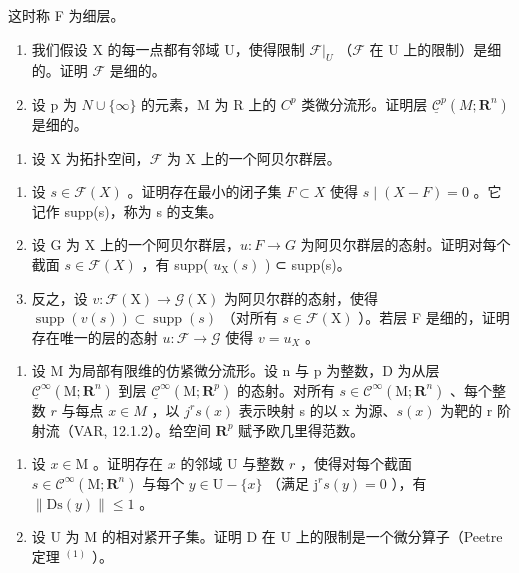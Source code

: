 这时称 F 为细层。

\begin{enumerate}
\def\labelenumi{\alph{enumi})}
\setcounter{enumi}{1}
\item
  我们假设 X 的每一点都有邻域 U，使得限制 \(\mathcal{F}|_{U}\) （\(\mathcal{F}\) 在 U 上的限制）是细的。证明 \(\mathcal{F}\) 是细的。
\item
  设 p 为 \(N \cup \{\infty\}\) 的元素，M 为 R 上的 \(C^{p}\) 类微分流形。证明层 \(\underline{\mathcal{C}}^{p}(M; \mathbf{R}^{n})\) 是细的。
\end{enumerate}

\begin{enumerate}
\def\labelenumi{\arabic{enumi})}
\setcounter{enumi}{1}
\tightlist
\item
  设 X 为拓扑空间，\(\mathcal{F}\) 为 X 上的一个阿贝尔群层。
\end{enumerate}

\begin{enumerate}
\def\labelenumi{\alph{enumi})}
\item
  设 \(s \in \mathcal{F}(X)\) 。证明存在最小的闭子集 \(F \subset X\) 使得 \(s \mid (X - F) = 0\) 。它记作 supp(s)，称为 s 的支集。
\item
  设 G 为 X 上的一个阿贝尔群层，\(u: F \to G\) 为阿贝尔群层的态射。证明对每个截面 \(s \in \mathcal{F}(X)\) ，有 supp( \(u_{\mathrm{X}}(s)\) ) ⊂ supp(s)。
\item
  反之，设 \(v\colon\mathcal{F}(\mathrm{X})\to\mathcal{G}(\mathrm{X})\) 为阿贝尔群的态射，使得 \(\operatorname{supp}(v(s))\subset\operatorname{supp}(s)\) （对所有 \(s\in\mathcal{F}(\mathrm{X})\) ）。若层 F 是细的，证明存在唯一的层的态射 \(u\colon\mathcal{F}\to\mathcal{G}\) 使得 \(v=u_{X}\) 。
\end{enumerate}

\begin{enumerate}
\def\labelenumi{\arabic{enumi})}
\setcounter{enumi}{2}
\tightlist
\item
  设 M 为局部有限维的仿紧微分流形。设 n 与 p 为整数，D 为从层 \(\underline{\mathcal{C}}^{\infty}(\mathrm{M};\mathbf{R}^{n})\) 到层 \(\underline{\mathcal{C}}^{\infty}(\mathrm{M};\mathbf{R}^{p})\) 的态射。对所有 \(s \in \mathcal{C}^{\infty}(\mathrm{M};\mathbf{R}^{n})\) 、每个整数 \(r\) 与每点 \(x \in M\) ，以 \(j^{r}s(x)\) 表示映射 s 的以 x 为源、\(s(x)\) 为靶的 r 阶射流（VAR, 12.1.2）。给空间 \(\mathbf{R}^{p}\) 赋予欧几里得范数。
\end{enumerate}

\begin{enumerate}
\def\labelenumi{\alph{enumi})}
\item
  设 \(x \in \mathrm{M}\) 。证明存在 \(x\) 的邻域 U 与整数 \(r\) ，使得对每个截面 \(s \in \mathcal{C}^{\infty}(\mathrm{M}; \mathbf{R}^{n})\) 与每个 \(y \in \mathrm{U} - \{x\}\) （满足 \(\mathrm{j}^{r}s(y) = 0\) ），有 \(\| \mathrm{Ds}(y) \| \leqslant 1\) 。
\item
  设 U 为 M 的相对紧开子集。证明 D 在 U 上的限制是一个微分算子（Peetre 定理 \(^{(1)}\) ）。
\end{enumerate}

